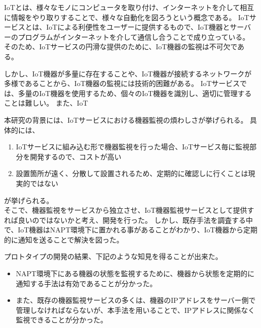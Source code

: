 IoTとは、様々なモノにコンピュータを取り付け、インターネットを介して相互に情報をやり取りすることで、様々な自動化を図ろうという概念である。
IoTサービスとは、IoTによる利便性をユーザーに提供するもので、IoT機器とサーバーのプログラムがインターネットを介して通信し合うことで成り立っている。
そのため、IoTサービスの円滑な提供のために、IoT機器の監視は不可欠である。

しかし、IoT機器が多量に存在することや、IoT機器が接続するネットワークが多様であることから、IoT機器の監視には技術的困難がある。
IoTサービスでは、多量のIoT機器を使用するため、個々のIoT機器を識別し、適切に管理することは難しい。
また、IoT













本研究の背景には、IoTサービスにおける機器監視の煩わしさが挙げられる。
具体的には、
\begin{enumerate}
	\item IoTサービスに組み込む形で機器監視を行った場合、IoTサービス毎に監視部分を開発するので、コストが高い
	\item 設置箇所が遠く、分散して設置されるため、定期的に確認しに行くことは現実的ではない
\end{enumerate}
が挙げられる。\\

そこで、機器監視をサービスから独立させ、IoT機器監視サービスとして提供すれば良いのではないかと考え、開発を行った。
しかし、既存手法を調査する中で、IoT機器はNAPT環境下に置かれる事があることがわかり、IoT機器から定期的に通知を送ることで解決を図った。

プロトタイプの開発の結果、下記のような知見を得ることが出来た。
\begin{itemize}
	\item NAPT環境下にある機器の状態を監視するために、機器から状態を定期的に通知する手法は有効であることが分かった。
	\item また、既存の機器監視サービスの多くは、機器のIPアドレスをサーバー側で管理しなければならないが、本手法を用いることで、IPアドレスに関係なく監視できることが分かった。
\end{itemize}

